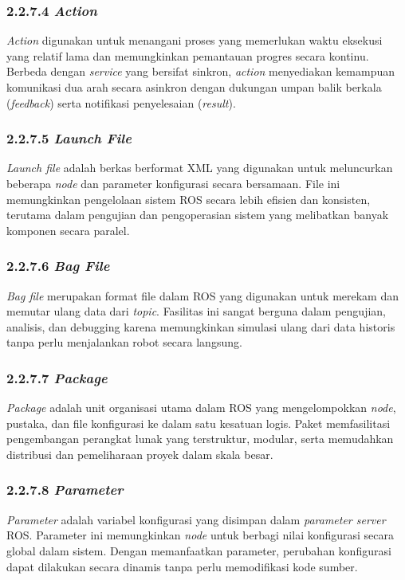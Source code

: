 \subsubsection{2.2.7.4 \emph{Action}}
\emph{Action} digunakan untuk menangani proses yang memerlukan waktu eksekusi yang relatif lama dan memungkinkan pemantauan progres secara kontinu. Berbeda dengan \emph{service} yang bersifat sinkron, \emph{action} menyediakan kemampuan komunikasi dua arah secara asinkron dengan dukungan umpan balik berkala (\emph{feedback}) serta notifikasi penyelesaian (\emph{result}).

\subsubsection{2.2.7.5 \emph{Launch File}}
\emph{Launch file} adalah berkas berformat XML yang digunakan untuk meluncurkan beberapa \emph{node} dan parameter konfigurasi secara bersamaan. File ini memungkinkan pengelolaan sistem ROS secara lebih efisien dan konsisten, terutama dalam pengujian dan pengoperasian sistem yang melibatkan banyak komponen secara paralel.

\subsubsection{2.2.7.6 \emph{Bag File}}
\emph{Bag file} merupakan format file dalam ROS yang digunakan untuk merekam dan memutar ulang data dari \emph{topic}. Fasilitas ini sangat berguna dalam pengujian, analisis, dan debugging karena memungkinkan simulasi ulang dari data historis tanpa perlu menjalankan robot secara langsung.

\subsubsection{2.2.7.7 \emph{Package}}
\emph{Package} adalah unit organisasi utama dalam ROS yang mengelompokkan \emph{node}, pustaka, dan file konfigurasi ke dalam satu kesatuan logis. Paket memfasilitasi pengembangan perangkat lunak yang terstruktur, modular, serta memudahkan distribusi dan pemeliharaan proyek dalam skala besar.

\subsubsection{2.2.7.8 \emph{Parameter}}
\emph{Parameter} adalah variabel konfigurasi yang disimpan dalam \emph{parameter server} ROS. Parameter ini memungkinkan \emph{node} untuk berbagi nilai konfigurasi secara global dalam sistem. Dengan memanfaatkan parameter, perubahan konfigurasi dapat dilakukan secara dinamis tanpa perlu memodifikasi kode sumber.

